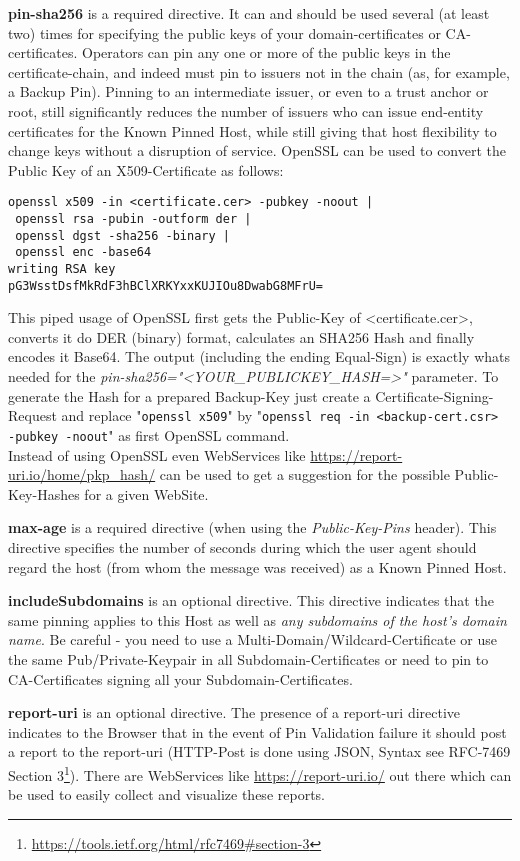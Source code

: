 \textbf{pin-sha256} is a required directive. It can and should be used several (at least two) times for specifying the public keys of your domain-certificates or CA-certificates. Operators can pin any one or more of the public keys in the certificate-chain, and indeed must pin to issuers not in the chain (as, for example, a Backup Pin). Pinning to an intermediate issuer, or even to a trust anchor or root, still significantly reduces the number of issuers who can issue end-entity certificates for the Known Pinned Host, while still giving that host flexibility to change keys without a disruption of service. OpenSSL can be used to convert the Public Key of an X509-Certificate as follows:
\begin{lstlisting}
openssl x509 -in <certificate.cer> -pubkey -noout | 
 openssl rsa -pubin -outform der | 
 openssl dgst -sha256 -binary | 
 openssl enc -base64
writing RSA key
pG3WsstDsfMkRdF3hBClXRKYxxKUJIOu8DwabG8MFrU=
\end{lstlisting} 
This piped usage of OpenSSL first gets the Public-Key of <certificate.cer>, converts it do DER (binary) format, calculates an SHA256 Hash and finally encodes it Base64. The output (including the ending Equal-Sign) is exactly whats needed for the \emph{pin-sha256="<YOUR\_PUBLICKEY\_HASH=>"} parameter. To generate the Hash for a prepared Backup-Key just create a Certificate-Signing-Request and replace "\texttt{openssl x509}" by "\texttt{openssl req -in <backup-cert.csr> -pubkey -noout}" as first OpenSSL command.\\ 
Instead of using OpenSSL even WebServices like \url{https://report-uri.io/home/pkp_hash/} can be used to get a suggestion for the possible Public-Key-Hashes for a given WebSite.

\textbf{max-age} is a required directive (when using the \emph{Public-Key-Pins} header). This directive specifies the number of seconds during which the user agent should regard the host (from whom the message was received) as a Known Pinned Host.

\textbf{includeSubdomains} is an optional directive. This directive indicates that the same pinning applies to this Host as well as \emph{any subdomains of the host's domain name}. Be careful - you need to use a Multi-Domain/Wildcard-Certificate or use the same Pub/Private-Keypair in all Subdomain-Certificates or need to pin to CA-Certificates signing all your Subdomain-Certificates.

\textbf{report-uri} is an optional directive. The presence of a report-uri directive indicates to the Browser that in the event of Pin Validation failure it should post a report to the report-uri (HTTP-Post is done using JSON, Syntax see {RFC-7469 Section 3}\footnote{\url{https://tools.ietf.org/html/rfc7469\#section-3}}). There are WebServices like \url{https://report-uri.io/} out there which can be used to easily collect and visualize these reports.

